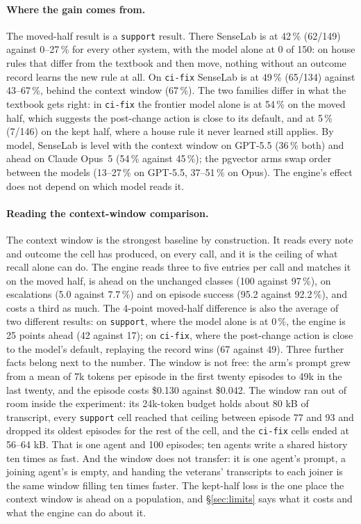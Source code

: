 \documentclass[11pt]{article}
\newcommand{\code}[1]{\texttt{#1}}
\begin{document}
\paragraph{Where the gain comes from.} The moved-half result is a \code{support} result. There
SenseLab is at 42\,\% (62/149) against 0--27\,\% for every other system, with the model alone at
0 of 150: on house rules that differ from the textbook and then move, nothing without an
outcome record learns the new rule at all. On \code{ci-fix} SenseLab is at 49\,\% (65/134)
against 43--67\,\%, behind the context window (67\,\%). The two families differ in what the
textbook gets right: in \code{ci-fix} the frontier model alone is at 54\,\% on the moved half,
which suggests the post-change action is close to its default, and at 5\,\% (7/146) on the kept
half, where a house rule it never learned still applies. By model, SenseLab is level with
the context window on GPT-5.5 (36\,\% both) and ahead on Claude Opus~5 (54\,\% against 45\,\%);
the pgvector arms swap order between the models (13--27\,\% on GPT-5.5, 37--51\,\% on Opus). The
engine's effect does not depend on which model reads it.

\paragraph{Reading the context-window comparison.}
\label{sec:cw}
The context window is the strongest baseline by construction. It reads every note and outcome
the cell has produced, on every call, and it is the ceiling of what recall alone can do. The
engine reads three to five entries per call and matches it on the moved half, is ahead on the
unchanged classes (100 against 97\,\%), on escalations (5.0 against 7.7\,\%) and on episode
success (95.2 against 92.2\,\%), and costs a third as much. The 4-point moved-half difference is
also the average of two different results: on \code{support}, where the model alone is at 0\,\%,
the engine is 25 points ahead (42 against 17); on \code{ci-fix}, where the post-change action is
close to the model's default, replaying the record wins (67 against 49). Three further facts
belong next to the number. The window is not free: the arm's prompt grew from a mean of 7k
tokens per episode in the first twenty episodes to 49k in the last twenty, and the episode costs
\$0.130 against \$0.042. The window ran out of room inside the experiment: its 24k-token budget
holds about 80 kB of transcript, every \code{support} cell reached that ceiling between episode
77 and 93 and dropped its oldest episodes for the rest of the cell, and the \code{ci-fix} cells
ended at 56--64 kB. That is one agent and 100 episodes; ten agents write a shared history ten
times as fast. And the window does not transfer: it is one agent's prompt, a joining agent's is
empty, and handing the veterans' transcripts to each joiner is the same window filling ten
times faster. The kept-half loss is the one place the context window is ahead on a population,
and \S\ref{sec:limits} says what it costs and what the engine can do about it.
\end{document}

